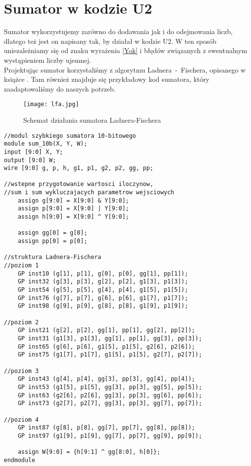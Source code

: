 \documentclass[a4paper]{article}
\begin{document}
\section{Sumator w kodzie U2}
Sumator wykorzystujemy zarówno do dodawania jak i do odejmowania liczb, dlatego też jest on napisany tak, by działał w kodzie U2. W ten sposób uniezależniamy się
od znaku wyrażenia \ref{Yok} i błędów związanych z ewentualnym wystąpieniem liczby ujemnej. \\ \indent Projektując sumator korzystaliśmy z algorytmu Ladnera~-~Fischera,
opisanego w książce \cite{ArytmUklReszt}. Tam również znajduje się przykładowy kod sumatora, który zaadaptowaliśmy do naszych potrzeb.
\begin{figure}[H]
 \texttt{[image: lfa.jpg]}
 \caption{Schemat działania sumatora Ladnera-Fischera}
\end{figure}

\begin{lstlisting}
//modul szybkiego sumatora 10-bitowego
module sum_10b(X, Y, W);
input [9:0] X, Y;
output [9:0] W;
wire [9:0] g, p, h, g1, p1, g2, p2, gg, pp;

//wstepne przygotowanie wartosci iloczynow,
//sum i sum wykluczajacych parametrow wejsciowych
	assign g[9:0] = X[9:0] & Y[9:0];
	assign p[9:0] = X[9:0] | Y[9:0];
	assign h[9:0] = X[9:0] ^ Y[9:0];

	assign gg[0] = g[0];
	assign pp[0] = p[0];

//struktura Ladnera-Fischera
//poziom 1
	GP inst10 (g[1], p[1], g[0], p[0], gg[1], pp[1]);
	GP inst32 (g[3], p[3], g[2], p[2], g1[3], p1[3]);
	GP inst54 (g[5], p[5], g[4], p[4], g1[5], p1[5]);
	GP inst76 (g[7], p[7], g[6], p[6], g1[7], p1[7]);
	GP inst98 (g[9], p[9], g[8], p[8], g1[9], p1[9]);

//poziom 2
	GP inst21 (g[2], p[2], gg[1], pp[1], gg[2], pp[2]);
	GP inst31 (g1[3], p1[3], gg[1], pp[1], gg[3], pp[3]);
	GP inst65 (g[6], p[6], g1[5], p1[5], g2[6], p2[6]);
	GP inst75 (g1[7], p1[7], g1[5], p1[5], g2[7], p2[7]);

//poziom 3
	GP inst43 (g[4], p[4], gg[3], pp[3], gg[4], pp[4]);
	GP inst53 (g1[5], p1[5], gg[3], pp[3], gg[5], pp[5]);
	GP inst63 (g2[6], p2[6], gg[3], pp[3], gg[6], pp[6]);
	GP inst73 (g2[7], p2[7], gg[3], pp[3], gg[7], pp[7]);

//poziom 4
	GP inst87 (g[8], p[8], gg[7], pp[7], gg[8], pp[8]);
	GP inst97 (g1[9], p1[9], gg[7], pp[7], gg[9], pp[9]);

	assign W[9:0] = {h[9:1] ^ gg[8:0], h[0]};
endmodule
\end{lstlisting}
\end{document}
